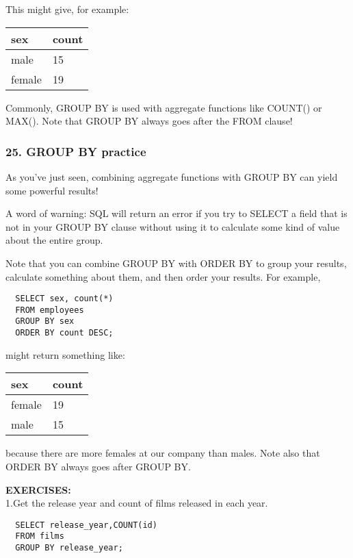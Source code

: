 \documentclass[
]{article}
\begin{document}
This might give, for example:

\begin{longtable}[]{@{}ll@{}}
\toprule
sex & count \\
\midrule
\endhead
male & 15 \\
female & 19 \\
\bottomrule
\end{longtable}

Commonly, GROUP BY is used with aggregate functions like COUNT() or
MAX(). Note that GROUP BY always goes after the FROM clause!

\hypertarget{group-by-practice}{%
\subsubsection{25. GROUP BY practice}\label{group-by-practice}}

As you've just seen, combining aggregate functions with GROUP BY can
yield some powerful results!

A word of warning: SQL will return an error if you try to SELECT a field
that is not in your GROUP BY clause without using it to calculate some
kind of value about the entire group.

Note that you can combine GROUP BY with ORDER BY to group your results,
calculate something about them, and then order your results. For
example,

\begin{verbatim}
  SELECT sex, count(*)
  FROM employees
  GROUP BY sex
  ORDER BY count DESC;
\end{verbatim}

might return something like:

\begin{longtable}[]{@{}ll@{}}
\toprule
sex & count \\
\midrule
\endhead
female & 19 \\
male & 15 \\
\bottomrule
\end{longtable}

because there are more females at our company than males. Note also that
ORDER BY always goes after GROUP BY.

\textbf{EXERCISES:}\\
1.Get the release year and count of films released in each year.

\begin{verbatim}
  SELECT release_year,COUNT(id)
  FROM films
  GROUP BY release_year;
\end{verbatim}
\end{document}
